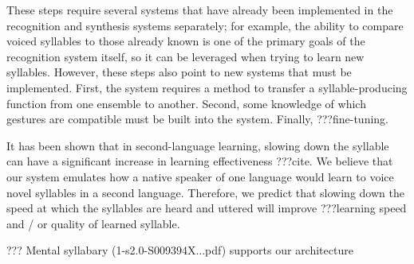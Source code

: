 These steps require several systems
that have already been implemented
in the recognition and synthesis systems separately;
for example, the ability to compare
voiced syllables to those already known
is one of the primary goals of the recognition system itself,
so it can be leveraged when trying to learn new syllables.
However, these steps also point to new systems
that must be implemented.
First, the system requires a method
to transfer a syllable-producing function
from one ensemble to another.
Second, some knowledge of which gestures
are compatible must be built into the system.
Finally, ???fine-tuning.

It has been shown that in second-language learning,
slowing down the syllable can have
a significant increase in learning effectiveness
???cite.
We believe that our system emulates
how a native speaker of one language
would learn to voice novel syllables in a second language.
Therefore, we predict that slowing down
the speed at which the syllables are heard
and uttered will improve ???learning speed
and / or quality of learned syllable.

??? Mental syllabary (1-s2.0-S009394X...pdf)
supports our architecture
